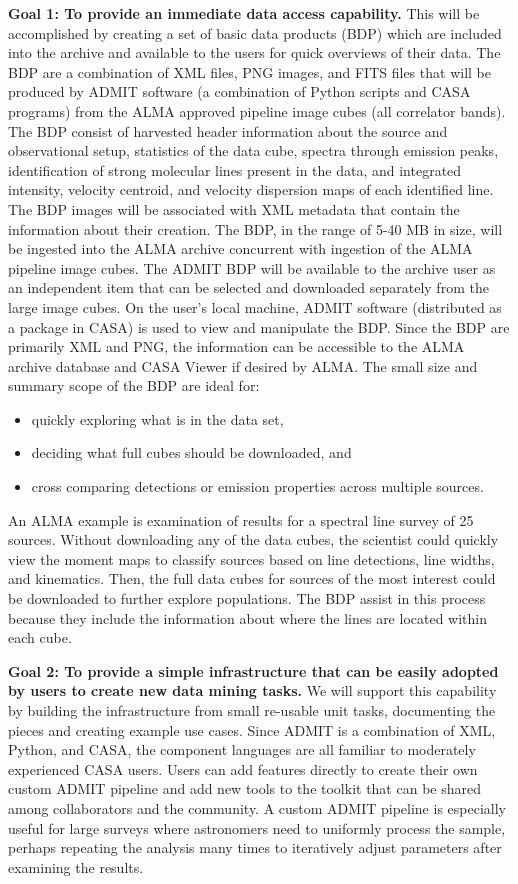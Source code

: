 \noindent
{\bf Goal 1: To provide an immediate data access capability.}  This will be accomplished by 
creating a set of basic data products (BDP) which are included into the archive and 
available to the users for quick overviews of their data. The BDP are a combination of 
XML files, PNG images, and FITS files that will be produced by ADMIT software 
(a combination of Python scripts and CASA programs) from the ALMA approved pipeline 
image cubes (all correlator bands). The BDP consist of harvested header information 
about the source and observational setup, statistics of the data cube, spectra through 
emission peaks, identification of strong molecular lines present in the data, and 
integrated intensity, velocity centroid, and velocity dispersion maps of each identified line. 
The BDP images will be associated with XML metadata that contain the information 
about their creation. The BDP, in the range of 5-40 MB in size, will be ingested into the 
ALMA archive concurrent with ingestion of the ALMA pipeline image cubes.  
The ADMIT BDP will be available to the archive user as an independent item 
that can be selected and downloaded separately from the large image cubes. 
On the user’s local machine, ADMIT software (distributed as a package in CASA) 
is used to view and manipulate the BDP. Since the BDP are primarily XML and PNG, 
the information can be accessible to the ALMA archive database and CASA Viewer if 
desired by ALMA. The small size and summary scope of the BDP are ideal for:
\begin{itemize}
\item quickly exploring what is in the data set, 
\item deciding what full cubes should be downloaded, and 
\item cross comparing detections or emission properties across multiple sources.  
\end{itemize}
\noindent
An ALMA example is examination of results for a spectral line survey of 25 sources.  
Without downloading any of the data cubes, the scientist could quickly view the 
moment maps to classify sources based on line detections, line widths, and kinematics.  
Then, the full data cubes for sources of the most interest could be downloaded to 
further explore populations. The BDP assist in this process because they include 
the information about where the lines are located within each cube.  

\noindent
{\bf Goal 2: To provide a simple infrastructure that can be easily adopted by users to 
create new data mining tasks.}  We will support this capability by building the 
infrastructure from small re-usable unit tasks, documenting the pieces and creating 
example use cases. Since ADMIT is a combination of XML, Python, and CASA, the 
component languages are all familiar to moderately experienced CASA users. 
Users can add features directly to create their own custom ADMIT pipeline and 
add new tools to the toolkit that can be shared among collaborators and the community.  
A custom ADMIT pipeline is especially useful for large surveys where astronomers need 
to uniformly process the sample, perhaps repeating the analysis many times to iteratively 
adjust parameters after examining the results.

